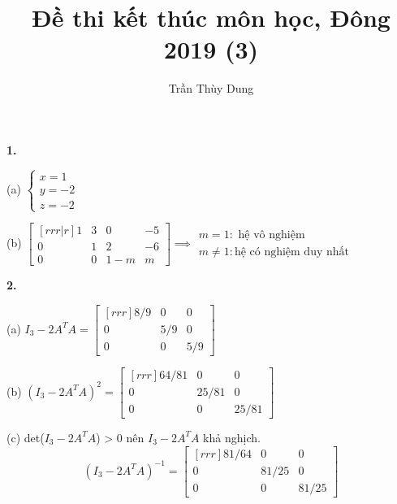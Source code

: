 \documentclass{article}
\title{Đề thi kết thúc môn học, Đông 2019 (3)}
\author{Trần Thùy Dung}
\date{}
\begin{document}
    \maketitle
    \textbf{1.} 

    \begin{minipage}{0.30\linewidth}
    (a) $ \begin{cases}{}
        x = 1 \\
        y = -2 \\
        z = -2
    \end{cases} \quad $ 
    
    \end{minipage} 
    \begin{minipage}{0.60\linewidth}
    (b) $ \begin{bmatrix}[rrr|r]
        1 & 3 & 0 & -5 \\
        0 & 1 & 2 & -6 \\
        0 & 0 & 1 - m & m 
    \end{bmatrix} \implies \begin{array}{l}
        m = 1 : \text{ hệ vô nghiệm } \\
        m \ne 1 : \text{hệ có nghiệm duy nhất}
    \end{array}$

    
    \end{minipage}




    \textbf{2.}

    \begin{minipage}{0.45\linewidth}
    (a) $I_3 - 2A^TA = \begin{bmatrix}[rrr]
        8/9 & 0 & 0 \\
        0 & 5/9 & 0 \\
        0 & 0 & 5/9 
    \end{bmatrix} $

    (b) $(I_3 - 2A^TA)^2 = \begin{bmatrix}[rrr]
        64/81 & 0 & 0 \\
        0 & 25/81 & 0 \\
        0 & 0 & 25/81 
    \end{bmatrix} $

    (c) det($I_3 - 2A^TA$) > 0 nên $I_3 - 2A^TA$ khả nghịch.
    \[(I_3 - 2A^TA)^{-1} = \begin{bmatrix}[rrr]
        81/64 & 0 & 0 \\
        0 & 81/25 & 0 \\
        0 & 0 & 81/25 
    \end{bmatrix} \]

        
    \end{minipage}
\end{document}
